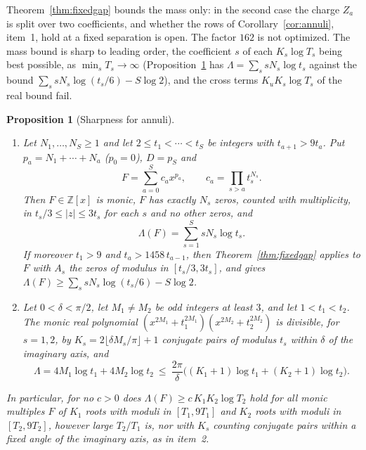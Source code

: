 \documentclass[11pt]{article}
\newtheorem{proposition}[theorem]{Proposition}
\begin{document}
Theorem~\ref{thm:fixedgap} bounds the mass only: in the second case the
charge $Z_a$ is split over two coefficients, and whether the rows of
Corollary~\ref{cor:annuli}, item~1, hold at a fixed separation is open.  The
factor $162$ is not optimized.  The mass bound is sharp to leading order, the
coefficient $s$ of each $K_s\log T_s$ being best possible, as
$\min_sT_s\to\infty$ (Proposition~\ref{prop:annulisharp} has
$\Lambda=\sum_ssN_s\log t_s$ against the bound
$\sum_ssN_s\log(t_s/6)-S\log2$), and the cross terms $K_uK_s\log T_s$ of the
real bound fail.

\begin{proposition}[Sharpness for annuli]\label{prop:annulisharp}
\leavevmode
\begin{enumerate}
\item Let $N_1,\ldots,N_S\ge1$ and let $2\le t_1<\cdots<t_S$ be integers with
$t_{a+1}>9t_a$.  Put $p_a=N_1+\cdots+N_a$ ($p_0=0$), $D=p_S$ and
\[
  F=\sum_{a=0}^Sc_ax^{p_a},\qquad c_a=\prod_{s>a}t_s^{N_s}.
\]
Then $F\in\mathbb Z[x]$ is monic, $F$ has exactly $N_s$ zeros, counted with
multiplicity, in $t_s/3\le|z|\le3t_s$ for each $s$ and no other zeros, and
\[
  \Lambda(F)=\sum_{s=1}^SsN_s\log t_s .
\]
If moreover $t_1>9$ and $t_a>1458\,t_{a-1}$, then
Theorem~\ref{thm:fixedgap} applies to $F$ with $A_s$ the zeros of modulus in
$[t_s/3,3t_s]$, and gives $\Lambda(F)\ge\sum_ssN_s\log(t_s/6)-S\log2$.
\item Let $0<\delta<\pi/2$, let $M_1\ne M_2$ be odd integers at least $3$,
and let $1<t_1<t_2$.  The monic real polynomial
$(x^{2M_1}+t_1^{2M_1})(x^{2M_2}+t_2^{2M_2})$ is divisible, for $s=1,2$, by
$K_s=2\lfloor\delta M_s/\pi\rfloor+1$ conjugate pairs of modulus $t_s$
within $\delta$ of the imaginary axis, and
\[
  \Lambda=4M_1\log t_1+4M_2\log t_2\ \le\
  \frac{2\pi}\delta\bigl((K_1+1)\log t_1+(K_2+1)\log t_2\bigr).
\]
\end{enumerate}
In particular, for no $c>0$ does $\Lambda(F)\ge c\,K_1K_2\log T_2$ hold for
all monic multiples $F$ of $K_1$ roots with moduli in $[T_1,9T_1]$ and $K_2$
roots with moduli in $[T_2,9T_2]$, however large $T_2/T_1$ is, nor with $K_s$
counting conjugate pairs within a fixed angle of the imaginary axis, as in
item~2.
\end{proposition}
\end{document}
